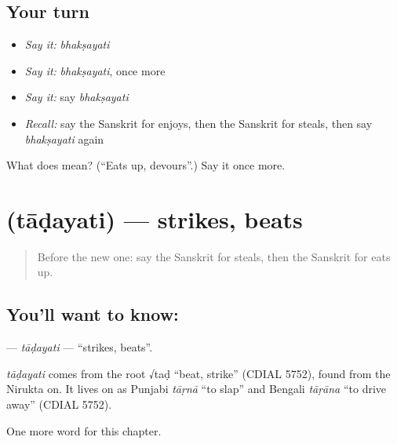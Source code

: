 \subsection*{Your turn}
\begin{itemize}
\raggedright
  \item \emph{Say it:} \emph{bhakṣayati}
  \item \emph{Say it:} \emph{bhakṣayati}, once more
  \item \emph{Say it:} say \emph{bhakṣayati}
  \item \emph{Recall:} say the Sanskrit for enjoys, then the Sanskrit for steals, then say \emph{bhakṣayati} again
\end{itemize}

\begin{tcolorbox}[breakable,colback=teal!4,colframe=teal!35!black,title={Before you move on}]
What does  mean? (\textquotedblleft{}Eats up, devours\textquotedblright{}.) Say it once more.
\end{tcolorbox}
\section[\texorpdfstring{\sk{ताडयति} (tāḍayati)}{ताडयति (tāḍayati)}]{ (tāḍayati) — strikes, beats}

\label{lesson:SA-C174-tadayati}



\begin{quote}
Before the new one: say the Sanskrit for steals, then the Sanskrit for eats up.
\end{quote}

\subsection*{You'll want to know: }
\textbf{} — \emph{tāḍayati} — \textquotedblleft{}strikes, beats\textquotedblright{}.

\begin{cousinweb}
\emph{tāḍayati} comes from the root √taḍ \textquotedblleft{}beat, strike\textquotedblright{} (CDIAL 5752), found from the Nirukta on. It lives on as Punjabi \emph{tāṛnā} \textquotedblleft{}to slap\textquotedblright{} and Bengali \emph{tāṛāna} \textquotedblleft{}to drive away\textquotedblright{} (CDIAL 5752).
\end{cousinweb}

\begin{grammarlens}[title={What you've built}]
One more word for this chapter.
\end{grammarlens}

